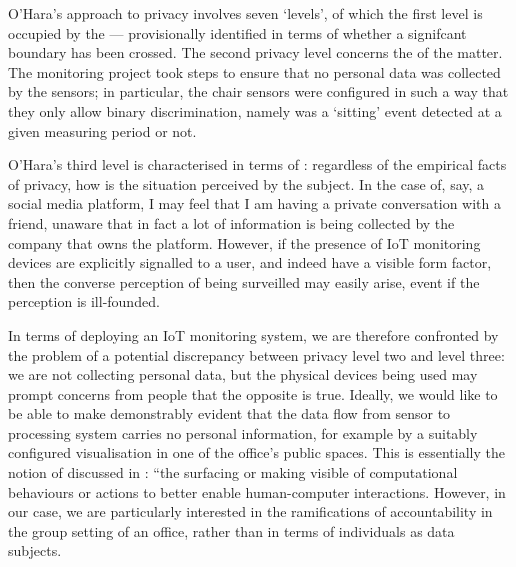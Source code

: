 O'Hara's \cite{Ohara-2016-TSVP} approach to privacy involves seven
`levels', of which the first level is occupied by the  --- provisionally identified in terms of whether a
signifcant boundary has been crossed. The second privacy level concerns the  of the matter. The monitoring project took steps to ensure
that no personal data was collected by the sensors; in particular, the
chair sensors were configured in such a way that they only allow binary
discrimination, namely was a `sitting' event detected at a given
measuring period or not.

 O'Hara's third level is characterised in terms
of : regardless of the empirical facts of privacy, how is the
situation perceived by the subject. In the case of, say, a social media
platform, I may feel that I am having a private conversation with a
friend, unaware that in fact a lot of information is being collected
by the company that owns the platform. However, if the presence of IoT
monitoring devices are explicitly signalled to a user, and indeed have
a visible form factor, then the converse perception of being
surveilled may easily arise, event if the perception is ill-founded.

In terms of deploying an IoT monitoring system, we are therefore
confronted by the problem of a potential discrepancy between privacy
level two and level three: we are not collecting personal data, but
the physical devices being used may prompt concerns from people that
the opposite is true. Ideally, we would like to be able to make demonstrably
evident that the data flow from sensor to processing system carries no
personal information, for example by a suitably configured
visualisation in one of the office's public spaces. This is essentially the notion of
 discussed in
\cite{Crabtree-2016-BAIT}: ``the surfacing or making visible of
computational behaviours or actions to better enable human-computer
interactions. However, in our case, we are particularly interested in
the ramifications of accountability in the group setting of an office,
rather than in terms of individuals as data subjects.



